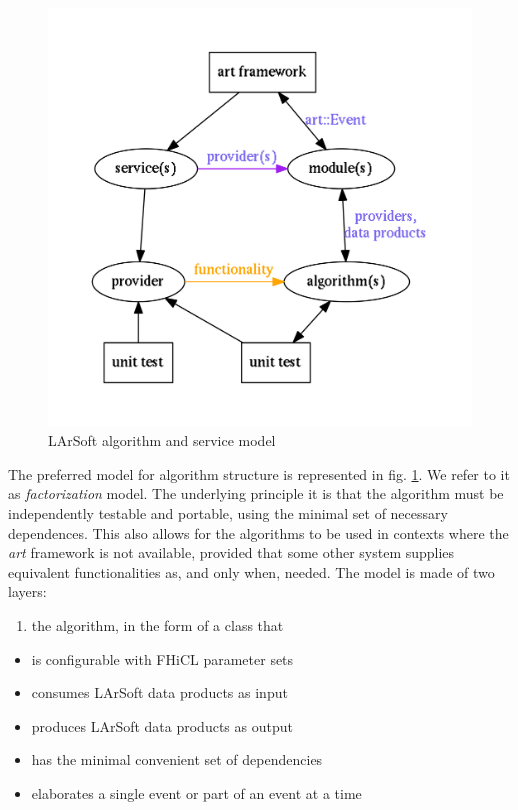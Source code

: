 \documentclass{article}
\begin{document}
\begin{figure}[htbp]
\centering
\includegraphics[width=\textwidth]{figures/LArSoftSimplifiedFactorizationModel.pdf}
\caption{\label{fig:AlgorithmModel}LArSoft algorithm and service model}
\end{figure}

The preferred model for algorithm structure is represented in fig.
\ref{fig:AlgorithmModel}. We refer to it as \emph{factorization} model.
The underlying principle it is that the algorithm must be independently
testable and portable, using the minimal set of necessary dependences.
This also allows for the algorithms to be used in contexts where the
\emph{art} framework is not available, provided that some other system
supplies equivalent functionalities as, and only when, needed. The model
is made of two layers:

\begin{enumerate}
\def\labelenumi{\arabic{enumi}.}
\item
  the algorithm, in the form of a class that
\end{enumerate}

\begin{itemize}
\item
  is configurable with FHiCL parameter sets
\item
  consumes LArSoft data products as input
\item
  produces LArSoft data products as output
\item
  has the minimal convenient set of dependencies
\item
  elaborates a single event or part of an event at a time
\end{itemize}
\end{document}
